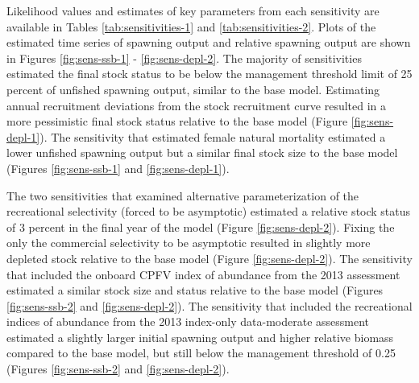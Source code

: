 \documentclass[11pt,
  english,
  a4paper,
]{article}
\begin{document}

Likelihood values and estimates of key parameters from each sensitivity are available in Tables \ref{tab:sensitivities-1} and \ref{tab:sensitivities-2}. Plots of the estimated time series of spawning output and relative spawning output are shown in Figures \ref{fig:sens-ssb-1} - \ref{fig:sens-depl-2}. The majority of sensitivities estimated the final stock status to be below the management threshold limit of 25 percent of unfished spawning output, similar to the base model. Estimating annual recruitment deviations from the stock recruitment curve resulted in a more pessimistic final stock status relative to the base model (Figure \ref{fig:sens-depl-1}). The sensitivity that estimated female natural mortality estimated a lower unfished spawning output but a similar final stock size to the base model (Figures \ref{fig:sens-ssb-1} and \ref{fig:sens-depl-1}).

\leavevmode\tagmcend\tagstructend\par


The two sensitivities that examined alternative parameterization of the recreational selectivity (forced to be asymptotic) estimated a relative stock status of 3 percent in the final year of the model (Figure \ref{fig:sens-depl-2}). Fixing the only the commercial selectivity to be asymptotic resulted in slightly more depleted stock relative to the base model (Figure \ref{fig:sens-depl-2}). The sensitivity that included the onboard CPFV index of abundance from the 2013 assessment estimated a similar stock size and status relative to the base model (Figures \ref{fig:sens-ssb-2} and \ref{fig:sens-depl-2}). The sensitivity that included the recreational indices of abundance from the 2013 index-only data-moderate assessment estimated a slightly larger initial spawning output and higher relative biomass compared to the base model, but still below the management threshold of 0.25 (Figures \ref{fig:sens-ssb-2} and \ref{fig:sens-depl-2}).

\leavevmode\tagmcend\tagstructend\par

\end{document}
